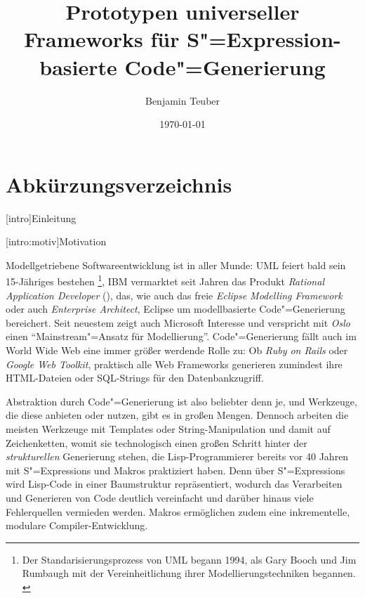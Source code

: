 \documentclass[a4paper, bibgerm]{book}
\newcommand\lchapter{}
\newcommand\lsection{}
\newcommand{\sexp}{S"=Expression}
\newcommand{\sexps}{S"=Expressions}
\newcommand{\cgen}{Code"=Generierung}
\begin{document}
\begin{titlepage}
\title{Prototypen universeller Frameworks für
  \sexp{}-basierte \cgen{}}
\author{Benjamin Teuber}
\date{\today}

\maketitle
\end{titlepage}

\tableofcontents

\listoffigures

\chapter*{Abkürzungsverzeichnis}
\begin{acronym}
\end{acronym}


\lchapter[intro]{Einleitung}

\lsection[intro:motiv]{Motivation}

Modellgetriebene Softwareentwicklung ist in aller Munde: UML
feiert bald sein 15-Jähriges bestehen \footnote{Der
  Standarisierungsprozess von UML begann 1994, als Gary Booch und Jim
  Rumbaugh mit der Vereinheitlichung ihrer Modellierungstechniken
  begannen. \cite{TODO}}, IBM vermarktet seit Jahren das Produkt
\textit{Rational Application Developer} (\cite{TODO}), das, wie auch das freie
\textit{Eclipse Modelling Framework} oder auch \textit{Enterprise
  Architect}, Eclipse um modellbasierte \cgen{}
bereichert. Seit neuestem zeigt auch Microsoft Interesse und
verspricht mit \textit{Oslo} \cite{TODO} einen ``Mainstream"=Ansatz
für Modellierung''. \cgen{} fällt auch im World Wide Web eine
immer größer werdende Rolle zu: Ob \textit{Ruby on Rails} oder
\textit{Google Web Toolkit}, praktisch alle Web Frameworks generieren
zumindest ihre HTML-Dateien oder SQL-Strings für den Datenbankzugriff.

Abstraktion durch \cgen{} ist also beliebter denn je, und
Werkzeuge, die diese anbieten oder nutzen, gibt es in großen
Mengen. Dennoch arbeiten die meisten Werkzeuge mit Templates oder
String-Manipulation und damit auf Zeichenketten, womit sie
technologisch einen großen Schritt hinter der \textit{strukturellen}
Generierung stehen, die Lisp-Programmierer bereits vor 40 Jahren mit
\sexps{} und Makros praktiziert haben. Denn über \sexps{} wird Lisp-Code
in einer Baumstruktur repräsentiert, wodurch das Verarbeiten
und Generieren von Code deutlich vereinfacht und darüber hinaus viele
Fehlerquellen vermieden werden. Makros ermöglichen zudem eine
inkrementelle, modulare Compiler-Entwicklung.
\end{document}
